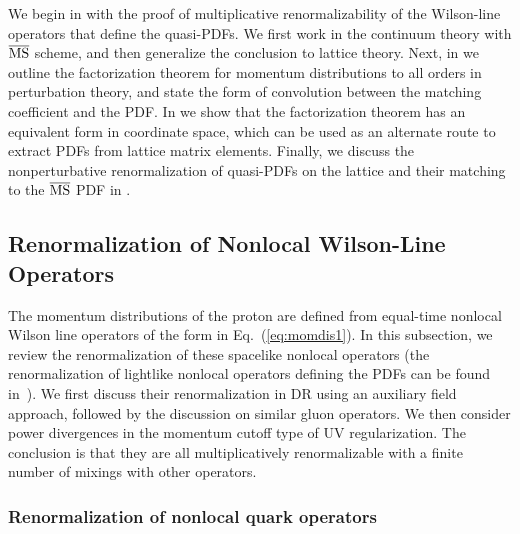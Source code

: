 We begin in  with the proof of multiplicative renormalizability of the Wilson-line operators that define the quasi-PDFs. We first work in the continuum theory with ${\overline{\rm MS}}$ scheme, and then generalize the conclusion to lattice theory.
Next, in  we outline the factorization theorem for momentum distributions to all orders
in perturbation theory, and state the form of convolution between the matching coefficient and the PDF. In  we show that the factorization theorem has an equivalent form in coordinate space, which can be used as an alternate route to extract PDFs from lattice matrix elements. Finally, we discuss the nonperturbative renormalization of quasi-PDFs on the lattice and their matching to the ${\overline{\rm MS}}$ PDF in .

\subsection{Renormalization of Nonlocal Wilson-Line Operators}
\label{sec:renorm-nl}
The momentum distributions of the proton are defined from
equal-time nonlocal Wilson line operators of the form in Eq.~(\ref{eq:momdis1}).
In this subsection, we review the renormalization of these spacelike nonlocal operators (the renormalization of lightlike nonlocal operators defining the PDFs can be found in~\cite{Collins:1981uw,Collins:2011zzd}). We first discuss their renormalization in DR using an auxiliary field approach, followed by the discussion on similar
gluon operators. We then consider power divergences
in the momentum cutoff type of UV regularization. The conclusion is that they are
all multiplicatively renormalizable with a finite number of mixings with other operators.

\subsubsection{Renormalization of nonlocal quark operators}

